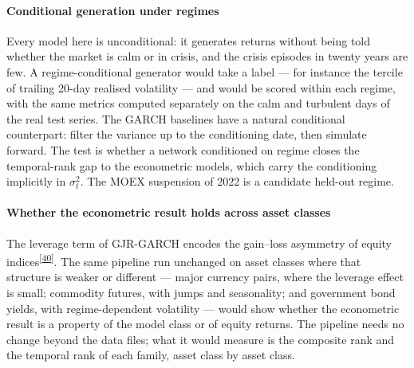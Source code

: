 \documentclass[11pt,a4paper]{article}
\makeatletter
\newcommand{\tcite}[1]{\textsuperscript{[\hyperlink{R:#1}{#1}]}}
\DeclareRobustCommand{\_}{\ifmmode\nfss@text{\textunderscore}\else\textunderscore\allowbreak\fi}
\makeatother
\begin{document}
\paragraph{Conditional generation under regimes} Every model here is unconditional: it generates returns without being told whether the market is calm or in crisis, and the crisis episodes in twenty years are few. A regime-conditional generator would take a label --- for instance the tercile of trailing 20-day realised volatility --- and would be scored within each regime, with the same metrics computed separately on the calm and turbulent days of the real test series. The GARCH baselines have a natural conditional counterpart: filter the variance up to the conditioning date, then simulate forward. The test is whether a network conditioned on regime closes the temporal-rank gap to the econometric models, which carry the conditioning implicitly in $\sigma_t^2$. The MOEX suspension of 2022 is a candidate held-out regime.

\paragraph{Whether the econometric result holds across asset classes} The leverage term of GJR-GARCH encodes the gain--loss asymmetry of equity indices\tcite{40}. The same pipeline run unchanged on asset classes where that structure is weaker or different --- major currency pairs, where the leverage effect is small; commodity futures, with jumps and seasonality; and government bond yields, with regime-dependent volatility --- would show whether the econometric result is a property of the model class or of equity returns. The pipeline needs no change beyond the data files; what it would measure is the composite rank and the temporal rank of each family, asset class by asset class.

\end{document}
